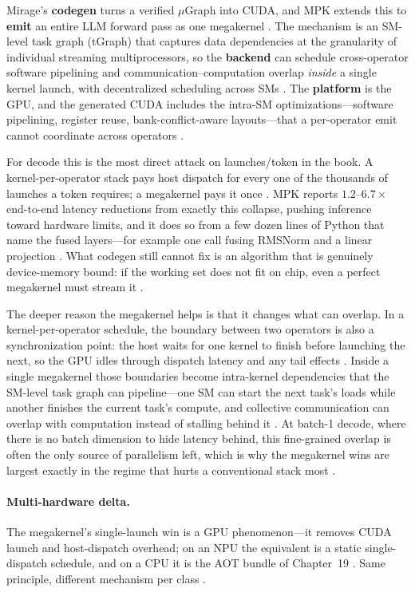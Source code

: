 Mirage's \textbf{codegen} turns a verified $\mu$Graph into CUDA, and MPK extends this to \textbf{emit} an entire LLM forward pass as one megakernel \citep{wu2024mirage,mpk2025}. The mechanism is an SM-level task graph (tGraph) that captures data dependencies at the granularity of individual streaming multiprocessors, so the \textbf{backend} can schedule cross-operator software pipelining and communication--computation overlap \emph{inside} a single kernel launch, with decentralized scheduling across SMs \citep{mpk2025}. The \textbf{platform} is the GPU, and the generated CUDA includes the intra-SM optimizations---software pipelining, register reuse, bank-conflict-aware layouts---that a per-operator emit cannot coordinate across operators \citep{mpk2025}.

For decode this is the most direct attack on launches/token in the book. A kernel-per-operator stack pays host dispatch for every one of the thousands of launches a token requires; a megakernel pays it once \citep{taxbreak2026,memoryfloor2026}. MPK reports $1.2$--$6.7\times$ end-to-end latency reductions from exactly this collapse, pushing inference toward hardware limits, and it does so from a few dozen lines of Python that name the fused layers---for example one call fusing RMSNorm and a linear projection \citep{mpk2025}. What codegen still cannot fix is an algorithm that is genuinely device-memory bound: if the working set does not fit on chip, even a perfect megakernel must stream it \citep{dlbook}.

The deeper reason the megakernel helps is that it changes what can overlap. In a kernel-per-operator schedule, the boundary between two operators is also a synchronization point: the host waits for one kernel to finish before launching the next, so the GPU idles through dispatch latency and any tail effects \citep{taxbreak2026}. Inside a single megakernel those boundaries become intra-kernel dependencies that the SM-level task graph can pipeline---one SM can start the next task's loads while another finishes the current task's compute, and collective communication can overlap with computation instead of stalling behind it \citep{mpk2025}. At batch-1 decode, where there is no batch dimension to hide latency behind, this fine-grained overlap is often the only source of parallelism left, which is why the megakernel wins are largest exactly in the regime that hurts a conventional stack most \citep{memoryfloor2026,kwon2023vllm}.

\paragraph{Multi-hardware delta.} The megakernel's single-launch win is a GPU phenomenon---it removes CUDA launch and host-dispatch overhead; on an NPU the equivalent is a static single-dispatch schedule, and on a CPU it is the AOT bundle of Chapter~19 \citep{amd2024aie,rotem2018glow}. Same principle, different mechanism per class \citep{semianalysis2024tma}.

